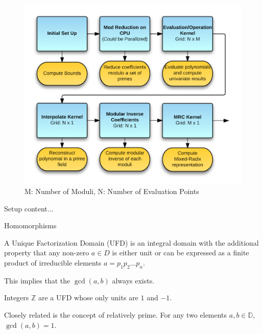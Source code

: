 \documentclass{beamer}
\begin{document}
	\begin{frame}
		\vspace{0.0in}
		\begin{figure}
		\centering
		\includegraphics[scale=0.20]{../Code/Images/FlowCUDAPoly3.png}
		\caption{M: Number of Moduli, N: Number of Evaluation Points}	
		\end{figure}
	\end{frame}
	
	\begin{frame}{Setup}
		content...
	\end{frame}
	
	\begin{frame}{Homomorphisms}
		
		
		A Unique Factorization Domain (UFD) is an integral domain with the additional property that any non-zero $a \in D$ is either unit or can  be expressed as a finite product of irreducible elements $a = p_1p_2\dots p_n$.	
		
		\vspace{0.2in}
		
		This implies that the $\gcd(a,b)$ always exists.
		\vspace{0.2in}
		
		Integers $\mathbb{Z}$ are a UFD whose only units are $1$ and $-1$.
		\vspace{0.2in}
		
		Closely related is the concept of relatively prime. For any two elements $a,b \in \mathbb{D}$, $\gcd(a,b) = 1$.
					
	\end{frame}
	
\end{document}
